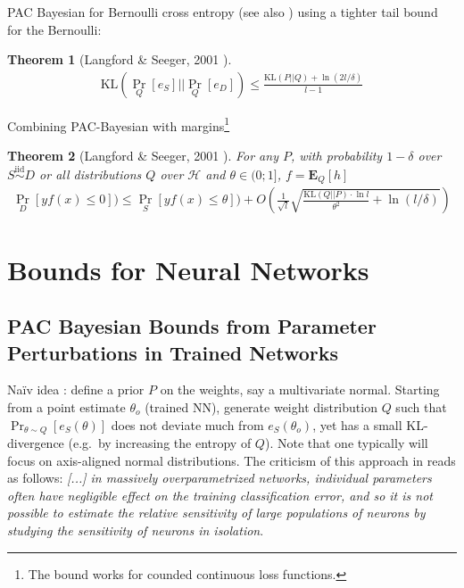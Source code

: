 \documentclass[10pt,a4paper]{article}
\newtheorem{theorem}{Theorem}
\begin{document}
\noindent PAC Bayesian for Bernoulli cross entropy (see also \cite{dziugaite2017computing}) using a tighter tail bound for the Bernoulli:
\begin{theorem}[Langford \& Seeger, 2001 \cite{langford2001bounds}]
\label{theorem:cross}
\begin{align*}
\text{KL}\left(\Pr_Q[e_S]|| \Pr_Q[e_D]\right) \le \frac{\text{KL}(P||Q) + \ln (2l/\delta)}{l-1}
\end{align*}
\end{theorem}

\noindent Combining PAC-Bayesian with margins\footnote{The bound works for counded continuous loss functions.}
\begin{theorem}[Langford \& Seeger, 2001 \cite{langford2001bounds}]
For any $P$, with probability $1-\delta$ over $S \stackrel {\text{iid} }\sim D$ or all distributions $Q$ over $\mathcal H$ and $\theta \in (0;1]$, $f=\mathbf E_Q[h]$
\begin{align*}
\Pr_{D}[yf(x)\le0])  \le \Pr_{S}[yf(x)\le \theta]) + 
O\left( 
	\frac 1 {\sqrt{l}} 	\sqrt{ \frac{\text{KL}(Q||P) \cdot \ln l}{\theta^2} + \ln (l/\delta)}
\right)
\end{align*}
\end{theorem}

\section{Bounds for Neural Networks}

\subsection{PAC Bayesian Bounds from Parameter Perturbations in Trained Networks}
Na\"iv idea \cite{langford2002not,langford2002quantitatively,dziugaite2017computing}: define  a prior $P$ on the weights, say a multivariate normal. Starting from a point estimate $\theta_o$  (trained NN), generate weight distribution $Q$ such that $\Pr_{\theta \sim Q}[e_S(\theta)]$ does not deviate much from $e_S(\theta_o)$, yet has a small KL-divergence (e.g.~by increasing the entropy of $Q$). Note that one typically will focus on axis-aligned normal distributions. The criticism of this approach in \cite{dziugaite2017computing} reads as follows: \textit{[...] in massively overparametrized networks, individual parameters often have negligible effect on the training classification error, and so it is not possible to estimate the relative sensitivity of large populations of neurons by studying the sensitivity of neurons in isolation}.
\end{document}
